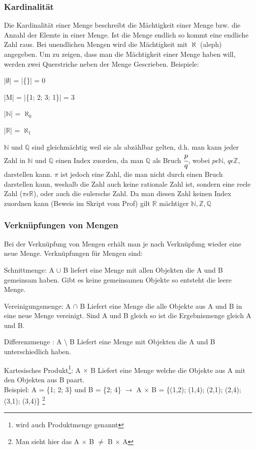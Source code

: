 \documentclass[a4paper,10pt]{scrartcl}
\begin{document}
        \subsubsection{Kardinalität}
        Die Kardinalität einer Menge beschreibt die Mächtigkeit einer Menge bzw. die Anzahl der Elemte in einer Menge. Ist die Menge endlich so kommt eine endliche Zahl raus.
        Bei unendlichen Mengen wird die Mächtigkeit mit $\aleph$ (aleph) angegeben. Um zu zeigen, dass man die Mächtigkeit einer Menge haben will, werden zwei Querstriche
        neben der Menge Gescrieben. Beispiele: 
        \begin{description}
            \item |$\emptyset$| = |\{\}| = 0
            \item |M| = |\{1; 2; 3; 1\}| = 3
            \item |$\mathbb{N}$| = $\aleph_0$
            \item |$\mathbb{R}$| = $\aleph_1$ 
        \end{description}
        $\mathbb{N}$ und $\mathbb{Q}$ sind gleichmächtig weil sie als abzählbar gelten, d.h. man kann jeder Zahl in $\mathbb{N}$ und $\mathbb{Q}$ einen Index zuorden, 
        da man $\mathbb{Q}$ als Bruch $\cfrac{p}{q}$, wobei $p \epsilon \mathbb{N}$, $q \epsilon \mathbb{Z}$, darstellen kann. $\pi$ ist jedoch eine Zahl, die man nicht durch einen Bruch
        darstellen kann, weshalb die Zahl auch keine rationale Zahl ist, sondern eine reele Zahl ($\pi \epsilon \mathbb{R}$), oder auch die eulersche Zahl. Da man diesen Zahl keinen Index zuordnen kann
        (Beweis im Skript vom Prof) gilt $\mathbb{R}$ mächtiger $\mathbb{N,Z,Q}$

        \subsubsection{Verknüpfungen von Mengen}
        Bei der Verknüpfung von Mengen erhält man je nach Verknüpfung wieder eine neue Menge. Verknüpfungen für Mengen sind:
        \begin{description}
            \item Schnittmenge:
                   A $\cup$ B liefert eine Menge mit allen Objekten die A und B gemeinsam haben. Gibt es keine gemeinsamen Objekte so entsteht die leere Menge. 
            \item Vereinigungsmenge: 
                   A $\cap$ B Liefert eine Menge die alle Objekte aus A und B in eine neue Menge vereinigt. Sind A und B gleich so ist die Ergebnismenge gleich A und B. 
            \item Differenzmenge :
                   A $\setminus$ B Liefert eine Menge mit Objekten die A und B unterschiedlich haben.
            \item Kartesisches Produkt\footnote{wird auch Produktmenge genannt}:
                   A $\times$ B Liefert eine Menge welche die Objekte aus A mit den Objekten aus B paart.\\
                   Beispiel: A = \{1; 2; 3\} und B = \{2; 4\} $\rightarrow$ A $\times$ B = \{(1,2); (1,4); (2,1); (2,4); (3,1); (3,4)\}
                   \footnote{Man sieht hier das A $\times$ B $\neq$ B $\times$ A}
        \end{description}
\end{document}
